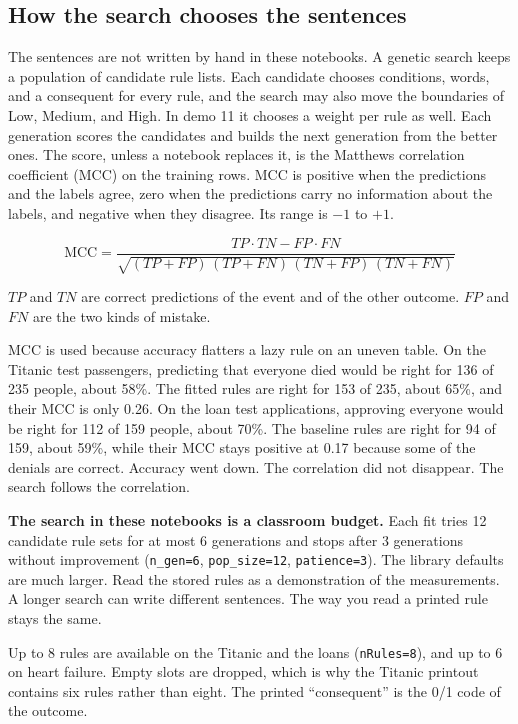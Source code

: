 \documentclass[11pt]{article}
\newcommand{\fn}[1]{\texttt{\small #1}}
\newcommand{\pct}[1]{\mbox{#1\%}}
\begin{document}
\subsection{How the search chooses the sentences}
\label{sec:search}

The sentences are not written by hand in these notebooks. A genetic search keeps a population of candidate rule lists. Each candidate chooses conditions, words, and a consequent for every rule, and the search may also move the boundaries of Low, Medium, and High. In demo 11 it chooses a weight per rule as well. Each generation scores the candidates and builds the next generation from the better ones. The score, unless a notebook replaces it, is the Matthews correlation coefficient (MCC) on the training rows. MCC is positive when the predictions and the labels agree, zero when the predictions carry no information about the labels, and negative when they disagree. Its range is \(-1\) to \(+1\).

\[
\mathrm{MCC}
=
\frac{TP \cdot TN - FP \cdot FN}
{\sqrt{(TP+FP)\,(TP+FN)\,(TN+FP)\,(TN+FN)}}
\]

\(TP\) and \(TN\) are correct predictions of the event and of the other outcome. \(FP\) and \(FN\) are the two kinds of mistake.

MCC is used because accuracy flatters a lazy rule on an uneven table. On the Titanic test passengers, predicting that everyone died would be right for 136 of 235 people, about \pct{58}. The fitted rules are right for 153 of 235, about \pct{65}, and their MCC is only 0.26. On the loan test applications, approving everyone would be right for 112 of 159 people, about \pct{70}. The baseline rules are right for 94 of 159, about \pct{59}, while their MCC stays positive at 0.17 because some of the denials are correct. Accuracy went down. The correlation did not disappear. The search follows the correlation.

\begin{careful}
\textbf{The search in these notebooks is a classroom budget.} Each fit tries 12 candidate rule sets for at most 6 generations and stops after 3 generations without improvement (\fn{n\_gen=6}, \fn{pop\_size=12}, \fn{patience=3}). The library defaults are much larger. Read the stored rules as a demonstration of the measurements. A longer search can write different sentences. The way you read a printed rule stays the same.
\end{careful}

Up to 8 rules are available on the Titanic and the loans (\fn{nRules=8}), and up to 6 on heart failure. Empty slots are dropped, which is why the Titanic printout contains six rules rather than eight. The printed ``consequent'' is the 0/1 code of the outcome.
\end{document}
